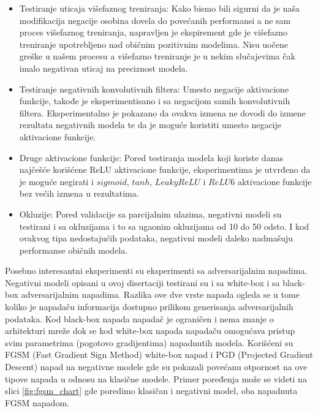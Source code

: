 \begin{itemize}
    \item Testiranje uticaja višefaznog treniranja: Kako bismo bili sigurni da je naša modifikacija negacije osobina dovela do povećanih performansi a ne sam proces višefaznog treniranja, napravljen je ekspirement gde je višefazno treniranje upotrebljeno nad običnim pozitivnim modelima. Nisu uočene greške u našem procesu a višefazno treniranje je u nekim slučajevima čak imalo negativan uticaj na preciznost modela.
    \item Testiranje negativnih konvolutivnih filtera: Umesto negacije aktivacione funkcije, takođe je eksperimentisano i sa negacijom samih konvolutivnih filtera. Eksperimentalno je pokazano da ovakva izmena ne dovodi do izmene rezultata negativnih modela te da je moguće koristiti umesto negacije aktivacione funkcije.
    \item Druge aktivacione funkcije: Pored testiranja modela koji koriste danas najčešće korišćene ReLU aktivacione funkcije, eksperimentima je utvrđeno da je moguće negirati i $ sigmoid $, $ tanh $, $LeakyReLU$ i $ReLU6$ aktivacione funkcije bez većih izmena u rezultatima.
    \item Okluzije: Pored validacije sa parcijalnim ulazima, negativni modeli su testirani i sa okluzijama i to sa ugaonim okluzijama od 10 do 50 odsto. I kod ovakvog tipa nedostajućih podataka, negativni modeli daleko nadmašuju performanse običnih modela.
\end{itemize}

Posebno interesantni eksperimenti su eksperimenti sa adversarijalnim napadima. Negativni modeli opisani u ovoj disertaciji testirani su i sa white-box i sa black-box adversarijalnim napadima. Razlika ove dve vrste napada ogleda se u tome koliko je napadaču informacija dostupno prilikom generisanja adversarijalnih podataka. Kod black-box napada napadač je ograničen i nema znanje o arhitekturi mreže dok se kod white-box napada napadaču omogućava pristup svim parametrima (pogotovo gradijentima) napadnutih modela. Korišćeni su FGSM (Fast Gradient Sign Method) \cite{goodfellowexplaining} white-box napad i PGD (Projected Gradient Descent) \cite{madry2017towards} napad na negativne modele gde su pokazali povećanu otpornost na ove tipove napada u odnosu na klasične modele. Primer poređenja može se videti na slici \ref{fig:fgsm_chart} gde poredimo klasičan i negativni model, oba napadnuta FGSM napadom.

